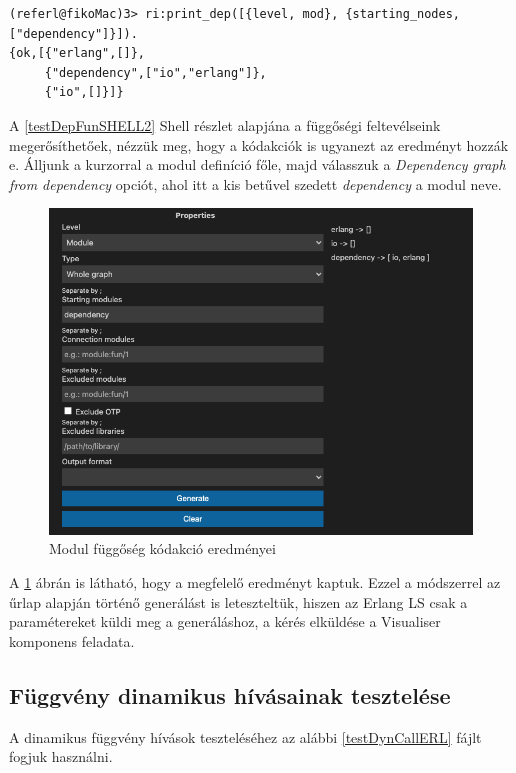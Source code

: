 \lstset{caption=Függvány függőség lekérdezésének eredménye, label=src:shell} \label{testDepFunSHELL2}
\begin{lstlisting}[language={shell}]  
(referl@fikoMac)3> ri:print_dep([{level, mod}, {starting_nodes, ["dependency"]}]).              
{ok,[{"erlang",[]},
     {"dependency",["io","erlang"]},
     {"io",[]}]}
\end{lstlisting}

A \ref{testDepFunSHELL2} Shell részlet alapjána a függőségi feltevélseink megerősíthetőek, nézzük meg, hogy a kódakciók is ugyanezt az eredményt hozzák e. Álljunk a kurzorral a modul definíció főle, majd válasszuk a \textit{Dependency graph from dependency} opciót, ahol itt a kis betűvel szedett \textit{dependency} a modul neve. 


\begin{figure}[H]
  \centering
  \includegraphics[width=0.8\linewidth]{images/testCases/depMod.png}
  \caption{Modul függőség kódakció eredményei}
  \label{fig:depMod}
\end{figure}

A \ref{fig:depMod} ábrán is látható, hogy a megfelelő eredményt kaptuk. Ezzel a módszerrel az űrlap alapján történő generálást is leteszteltük, hiszen az Erlang LS csak a paramétereket küldi meg a generáláshoz, a kérés elküldése a Visualiser komponens feladata.


\subsection{Függvény dinamikus hívásainak tesztelése}

A dinamikus függvény hívások teszteléséhez az alábbi \ref{testDynCallERL} fájlt fogjuk használni.

